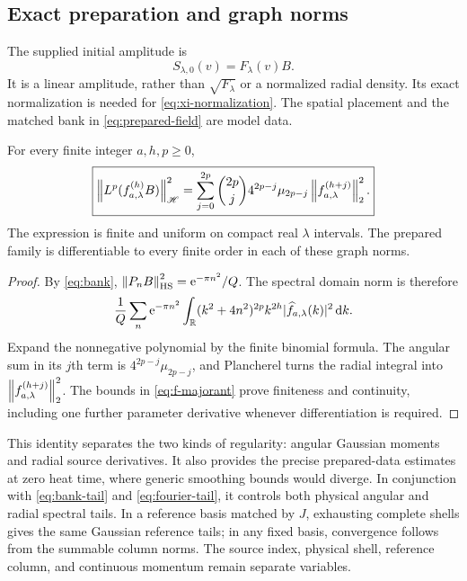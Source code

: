 \subsection{Exact preparation and graph norms}

The supplied initial amplitude is
\begin{equation}
 S_{\lambda,0}(v)=F_\lambda(v)B.
 \label{eq:prepared-field}
\end{equation}
It is a linear amplitude, rather than $\sqrt{F_\lambda}$ or a normalized
radial density. Its exact normalization is needed for
\eqref{eq:xi-normalization}. The spatial placement and the matched bank
in \eqref{eq:prepared-field} are model data.

\begin{proposition}
\label{prop:graph-identity}
For every finite integer $a,h,p\ge0$,
\begin{equation}
 \boxed{\left\lVert L^p(f_{a,\lambda}^{(h)}B)\right\rVert_{\mathscr H}^2
 =\sum_{j=0}^{2p}\binom{2p}{j}4^{2p-j}\mu_{2p-j}
                 \left\lVert f_{a,\lambda}^{(h+j)}\right\rVert_2^2.}
 \label{eq:graph-identity}
\end{equation}
The expression is finite and uniform on compact real $\lambda$
intervals. The prepared family is differentiable to every finite order
in each of these graph norms.
\end{proposition}

\begin{proof}
By \eqref{eq:bank},
$\left\lVert P_nB\right\rVert_{\operatorname{HS}}^2=\mathrm e^{-\pi n^2}/Q$. The spectral domain norm is
therefore
\begin{equation*}
 \frac1Q\sum_n\mathrm e^{-\pi n^2}\int_\mathbb R
 (k^2+4n^2)^{2p}k^{2h}|\widehat f_{a,\lambda}(k)|^2\,\mathrm d k.
\end{equation*}
Expand the nonnegative polynomial by the finite binomial formula.
The angular sum in its $j$th term is $4^{2p-j}\mu_{2p-j}$, and
Plancherel turns the radial integral into
$\left\lVert f_{a,\lambda}^{(h+j)}\right\rVert_2^2$. The bounds in
\eqref{eq:f-majorant} prove finiteness and continuity, including one
further parameter derivative whenever differentiation is required.
\end{proof}

This identity separates the two kinds of regularity: angular Gaussian
moments and radial source derivatives. It also provides the precise
prepared-data estimates at zero heat time, where generic smoothing
bounds would diverge. In conjunction with
\eqref{eq:bank-tail} and \eqref{eq:fourier-tail}, it controls both
physical angular and radial spectral tails. In a reference basis
matched by $J$, exhausting complete shells gives the same Gaussian
reference tails; in any fixed basis, convergence follows from the
summable column norms. The source index, physical shell, reference
column, and continuous momentum remain separate variables.
